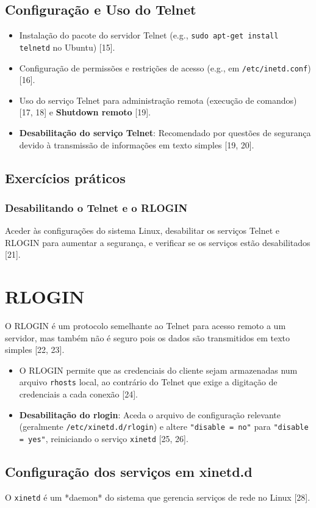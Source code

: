 \documentclass[12pt, a4paper]{article}
\begin{document}
	\subsection{Configuração e Uso do Telnet}
	\begin{itemize}
		\item Instalação do pacote do servidor Telnet (e.g., \texttt{sudo apt-get install telnetd} no Ubuntu) [15].
		\item Configuração de permissões e restrições de acesso (e.g., em \texttt{/etc/inetd.conf}) [16].
		\item Uso do serviço Telnet para administração remota (execução de comandos) [17, 18] e \textbf{Shutdown remoto} [19].
		\item \textbf{Desabilitação do serviço Telnet}: Recomendado por questões de segurança devido à transmissão de informações em texto simples [19, 20].
	\end{itemize}
	\subsection{Exercícios práticos} %
	\subsubsection{Desabilitando o Telnet e o RLOGIN}
	Aceder às configurações do sistema Linux, desabilitar os serviços Telnet e RLOGIN para aumentar a segurança, e verificar se os serviços estão desabilitados [21].
	
	\section{RLOGIN} %
	O RLOGIN é um protocolo semelhante ao Telnet para acesso remoto a um servidor, mas também não é seguro pois os dados são transmitidos em texto simples [22, 23].
	\begin{itemize}
		\item O RLOGIN permite que as credenciais do cliente sejam armazenadas num arquivo \texttt{rhosts} local, ao contrário do Telnet que exige a digitação de credenciais a cada conexão [24].
		\item \textbf{Desabilitação do rlogin}: Aceda o arquivo de configuração relevante (geralmente \texttt{/etc/xinetd.d/rlogin}) e altere \texttt{"disable = no"} para \texttt{"disable = yes"}, reiniciando o serviço \texttt{xinetd} [25, 26].
	\end{itemize}
	\subsection{Configuração dos serviços em xinetd.d} %
	O \texttt{xinetd} é um *daemon* do sistema que gerencia serviços de rede no Linux [28].
\end{document}
